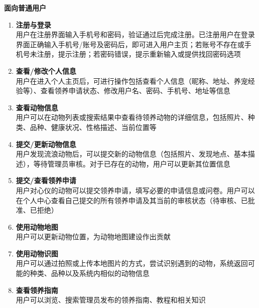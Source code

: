 \documentclass[12pt,a4paper,UTF8]{article}
\begin{document}
\noindent\textbf{面向普通用户}
\begin{enumerate}
    \item \textbf{注册与登录} \\
    用户在注册界面输入手机号和密码，验证通过后完成注册。已注册用户在登录界面正确输入手机号/账号及密码后，即可进入用户主页；若账号不存在或手机号未注册，提示注册；若密码错误，提示重新输入或提供找回密码选项
    \item \textbf{查看/修改个人信息} \\
    用户在进入个人主页后，可进行操作包括查看个人信息（昵称、地址、养宠经验等）、查看领养申请状态、修改用户名、密码、手机号、地址等信息
    \item \textbf{查看动物信息} \\
    用户可以在动物列表或搜索结果中查看待领养动物的详细信息，包括照片、种类、品种、健康状况、性格描述、当前位置等
    \item \textbf{提交/更新动物信息} \\
    用户发现流浪动物后，可以提交新的动物信息（包括照片、发现地点、基本描述），等待管理员审核。对于已存在的动物，用户可以更新其位置信息
    \item \textbf{提交/查看领养申请} \\
    用户对心仪的动物可以提交领养申请，填写必要的申请信息或问卷。用户可以在个人中心查看自己提交的所有领养申请及其当前的审核状态（待审核、已批准、已拒绝）
    \item \textbf{使用动物地图} \\
    用户可以更新动物位置，为动物地图建设作出贡献
    \item \textbf{使用动物识图} \\
    用户可以通过拍照或上传本地图片的方式，尝试识别遇到的动物，系统返回可能的种类、品种以及系统内相似的动物信息
    \item \textbf{查看领养指南} \\
    用户可以浏览、搜索管理员发布的领养指南、教程和相关知识
\end{enumerate}

\vspace{0.5cm}
\end{document}
